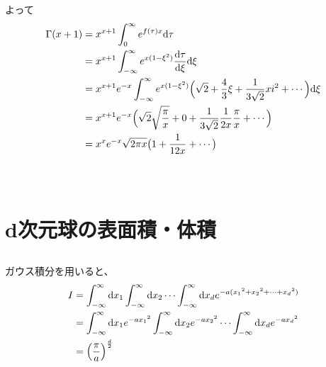 \documentclass[dvipdfmx,a4paper]{jsarticle}
\begin{document}
よって
\begin{align*}
\Gamma(x + 1) &= x^{x + 1}\int_{0}^{\infty}e^{f(\tau)x} \mathrm{d}\tau\\
&= x^{x + 1}\int_{-\infty}^{\infty} e^{x(1 - \xi^2)}\frac{\mathrm{d}\tau}{\mathrm{d}\xi}\mathrm{d}\xi\\
&= x^{x + 1}e^{-x}\int_{-\infty}^{\infty} e^{x(1 - \xi^2)}\Bigl(\sqrt{2} + \frac{4}{3}\xi + \frac{1}{3\sqrt{2}}xi^2 + \cdots\Bigr)\mathrm{d}\xi\\
&= x^{x + 1}e^{-x}\Bigl(\sqrt{2}\sqrt{\frac{\pi}{x}} + 0  + \frac{1}{3\sqrt{2}}\frac{1}{2x}{\frac{\pi}{x}} + \cdots\Bigr)\\
&= x^xe^{-x}\sqrt{2\pi x}\bigl(1 + \frac{1}{12x} + \cdots\bigr)
\end{align*}
\\\\

\section{d次元球の表面積・体積}
\subsection{}
ガウス積分を用いると、
\begin{align*}
I &= \int_{-\infty}^{\infty}\mathrm{d}x_1\int_{-\infty}^{\infty}\mathrm{d}x_2\cdots\int_{-\infty}^{\infty}\mathrm{d}x_de^{-a({x_1}^2 + {x_2}^2 + \cdots + {x_d}^2)}\\
&= \int_{-\infty}^{\infty}\mathrm{d}x_1e^{-a{x_1}^2} \int_{-\infty}^{\infty}\mathrm{d}x_2e^{-a{x_2}^2} \cdots\int_{-\infty}^{\infty}\mathrm{d}x_de^{-a{x_d}^2} \\
&=\Bigl(\frac{\pi}{a}\Bigr)^{\frac{d}{2}}
\end{align*}
\\
\end{document}

